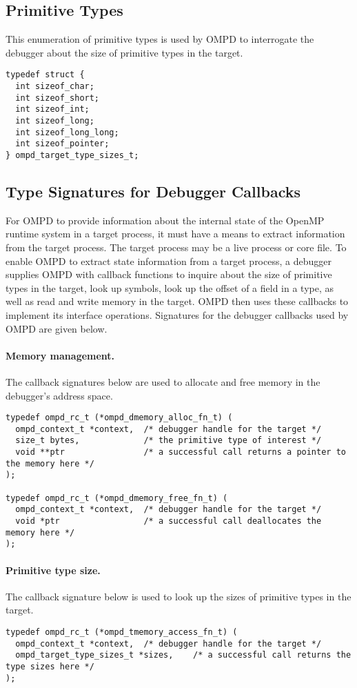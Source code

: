 \documentclass{article}
\begin{document}
\subsection{Primitive Types}

This enumeration of primitive types is used by OMPD to interrogate the debugger about the size of primitive types in the target.

\begin{verbatim}
typedef struct {
  int sizeof_char;
  int sizeof_short;
  int sizeof_int;
  int sizeof_long;
  int sizeof_long_long;
  int sizeof_pointer;
} ompd_target_type_sizes_t;
\end{verbatim}

\subsection{Type Signatures for Debugger Callbacks}
For OMPD to provide information  about the internal state of the OpenMP runtime system in a target process, it must have a means to extract information from the target process. The target process  may be  a live process or core file. 
To enable OMPD to extract state information from a target process, a debugger supplies OMPD with callback functions to inquire about the size of primitive types in the target, look up symbols, look up the offset of a field in a type, as well as read and write memory in the target. OMPD then uses these callbacks to implement its interface operations. Signatures for the debugger callbacks used by OMPD are given below.

\paragraph{Memory management.} The callback signatures below are used to allocate and free memory in the debugger's address space.
\begin{verbatim}
typedef ompd_rc_t (*ompd_dmemory_alloc_fn_t) (
  ompd_context_t *context,  /* debugger handle for the target */
  size_t bytes,             /* the primitive type of interest */
  void **ptr                /* a successful call returns a pointer to the memory here */
);

typedef ompd_rc_t (*ompd_dmemory_free_fn_t) (
  ompd_context_t *context,  /* debugger handle for the target */
  void *ptr                 /* a successful call deallocates the memory here */
);
\end{verbatim}

\paragraph{Primitive type size.} The callback signature below is used to look up the sizes of primitive types in the target.
\begin{verbatim}
typedef ompd_rc_t (*ompd_tmemory_access_fn_t) (
  ompd_context_t *context,  /* debugger handle for the target */
  ompd_target_type_sizes_t *sizes,    /* a successful call returns the  type sizes here */         
);
\end{verbatim}
\end{document}
